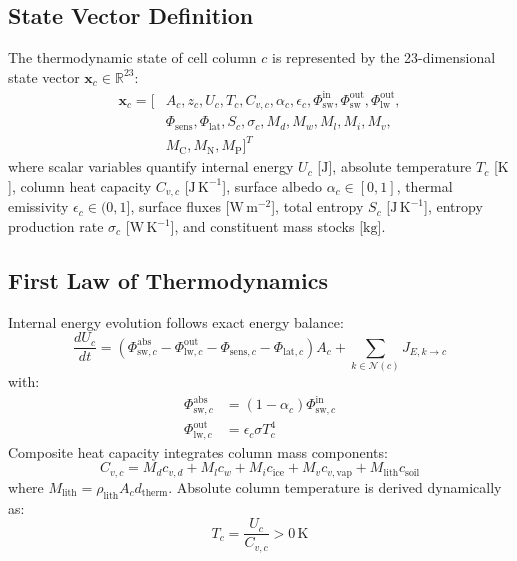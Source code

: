 \documentclass[10pt,twocolumn,a4paper]{article}
\begin{document}
\subsection{State Vector Definition}
The thermodynamic state of cell column $c$ is represented by the 23-dimensional state vector $\mathbf{x}_c \in \mathbb{R}^{23}$:
\begin{align}
\mathbf{x}_c = [ & A_c, z_c, U_c, T_c, C_{v, c}, \alpha_c, \epsilon_c, \Phi_{\mathrm{sw}}^{\mathrm{in}}, \Phi_{\mathrm{sw}}^{\mathrm{out}}, \Phi_{\mathrm{lw}}^{\mathrm{out}}, \nonumber \\
& \Phi_{\mathrm{sens}}, \Phi_{\mathrm{lat}}, S_c, \sigma_c, M_d, M_w, M_l, M_i, M_v, \nonumber \\
& M_{\mathrm{C}}, M_{\mathrm{N}}, M_{\mathrm{P}} ]^T
\end{align}
where scalar variables quantify internal energy $U_c$ [$\mathrm{J}$], absolute temperature $T_c$ [$\mathrm{K}$], column heat capacity $C_{v, c}$ [$\mathrm{J\,K^{-1}}$], surface albedo $\alpha_c \in [0, 1]$, thermal emissivity $\epsilon_c \in (0, 1]$, surface fluxes [$\mathrm{W\,m^{-2}}$], total entropy $S_c$ [$\mathrm{J\,K^{-1}}$], entropy production rate $\sigma_c$ [$\mathrm{W\,K^{-1}}$], and constituent mass stocks [$\mathrm{kg}$].

\subsection{First Law of Thermodynamics}
Internal energy evolution follows exact energy balance:
\begin{equation}
\frac{dU_c}{dt} = \left( \Phi_{\mathrm{sw}, c}^{\mathrm{abs}} - \Phi_{\mathrm{lw}, c}^{\mathrm{out}} - \Phi_{\mathrm{sens}, c} - \Phi_{\mathrm{lat}, c} \right) A_c + \sum_{k \in \mathcal{N}(c)} J_{E, k \to c}
\end{equation}
with:
\begin{align}
\Phi_{\mathrm{sw}, c}^{\mathrm{abs}} &= (1 - \alpha_c) \Phi_{\mathrm{sw}, c}^{\mathrm{in}} \\
\Phi_{\mathrm{lw}, c}^{\mathrm{out}} &= \epsilon_c \sigma T_c^4
\end{align}
Composite heat capacity integrates column mass components:
\begin{equation}
C_{v, c} = M_d c_{v, d} + M_l c_w + M_i c_{\mathrm{ice}} + M_v c_{v, \mathrm{vap}} + M_{\mathrm{lith}} c_{\mathrm{soil}}
\end{equation}
where $M_{\mathrm{lith}} = \rho_{\mathrm{lith}} A_c d_{\mathrm{therm}}$. Absolute column temperature is derived dynamically as:
\begin{equation}
T_c = \frac{U_c}{C_{v, c}} > 0\,\mathrm{K}
\end{equation}
\end{document}
